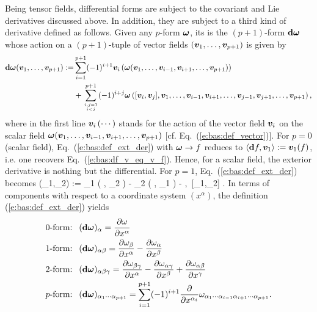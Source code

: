 Being tensor fields, differential forms are subject to the covariant
and Lie derivatives discussed above. In addition, they are subject to a third kind
of derivative defined as follows.  Given any $p$-form $\bm{\omega}$,
its 
is the $(p+1)$-form $\mathbf{d}\bm{\omega}$
whose action on a $(p+1)$-tuple of vector fields $(\bm{v}_1,\ldots,\bm{v}_{p+1})$
is given by
\begin{align}
\mathbf{d}\bm{\omega}(\bm{v}_1,\ldots,\bm{v}_{p+1}) := & \sum_{i=1}^{p+1} (-1)^{i+1}
    \bm{v}_i\left(\bm{\omega}(\bm{v}_1,\ldots,\bm{v}_{i-1},\bm{v}_{i+1},\ldots,\bm{v}_{p+1})\right) \nonumber \\
    & + \sum_{i,j=1\atop i < j}^{p+1}
    (-1)^{i+j} \bm{\omega}\left([\bm{v}_i,\bm{v}_j],\bm{v}_1,\ldots,\bm{v}_{i-1},\bm{v}_{i+1},
        \ldots,\bm{v}_{j-1},\bm{v}_{j+1},\ldots,\bm{v}_{p+1}\right) , \label{e:bas:def_ext_der}
\end{align}
where in the first line $\bm{v}_i\left(\cdots\right)$ stands for the action of the vector field
$\bm{v}_i$ on the scalar field $\bm{\omega}(\bm{v}_1,\ldots,\bm{v}_{i-1},\bm{v}_{i+1},\ldots,\bm{v}_{p+1})$
[cf. Eq.~(\ref{e:bas:def_vector})].
For $p=0$ (scalar field), Eq.~(\ref{e:bas:def_ext_der}) with $\bm{\omega}\to f$  reduces
to $\langle \mathbf{d} f, \bm{v}_1 \rangle := \bm{v}_1(f)$, i.e. one recovers Eq.~(\ref{e:bas:df_v_eq_v_f}). Hence, for a
scalar field, the exterior derivative is nothing but the differential. For $p=1$, Eq.~(\ref{e:bas:def_ext_der})
becomes
\be \label{e:bas:def_ext_der_p1}
    \dd\w{\omega}(_1,_2) := _1 \left( \langle \w{\omega}, _2 \rangle \right)
        - _2 \left( \langle \w{\omega}, _1 \rangle \right)
        - \left\langle \w{\omega},\, [_1,_2] \right\rangle .
\ee
In terms of components with respect to a coordinate system $(x^\alpha)$,
the definition (\ref{e:bas:def_ext_der}) yields
\begin{subequations}
\label{e:bas:def_der_ext_comp}
\begin{align}
    \mbox{0-form: \ }  & (\mathbf{d}\bm{\omega})_\alpha =
        \frac{\partial \omega}{\partial x^\alpha} \label{e:bas:def_ext_0f} \\
    \mbox{1-form: \ }  & (\mathbf{d}\bm{\omega})_{\alpha\beta} =
    \frac{\partial \omega_\beta}{\partial x^\alpha} - \frac{\partial \omega_\alpha}{\partial x^\beta}
             \label{e:bas:def_ext_1f} \\
    \mbox{2-form: \ }  & (\mathbf{d}\bm{\omega})_{\alpha\beta\gamma} =
    \frac{\partial \omega_{\beta\gamma}}{\partial x^\alpha} -
    \frac{\partial \omega_{\alpha\gamma}}{\partial x^\beta} +
    \frac{\partial \omega_{\alpha\beta}}{\partial x^\gamma} \label{e:bas:def_ext_2f} \\
     \mbox{$p$-form: \ }  &
     (\mathbf{d}\bm{\omega})_{\alpha_1\cdots\alpha_{p+1}} =
     \sum_{i=1}^{p+1} (-1)^{i+1} \frac{\partial }{\partial x^{\alpha_i}}
     \omega_{\alpha_1\cdots\alpha_{i-1}\alpha_{i+1}\cdots\alpha_{p+1}} .
\end{align}
\end{subequations}

